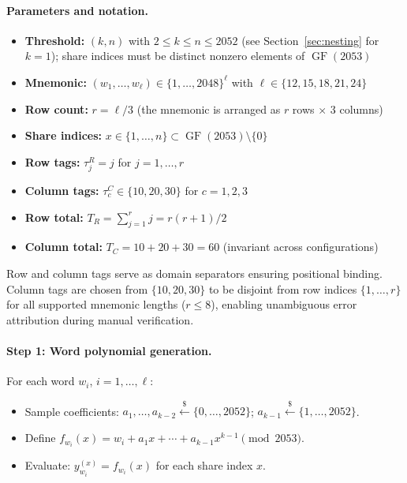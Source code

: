 \documentclass[11pt]{article}
\newcommand{\GF}{\operatorname{GF}}
\begin{document}
\paragraph{Parameters and notation.}
\begin{itemize}[noitemsep]
    \item \textbf{Threshold:} $(k, n)$ with $2 \leq k \leq n \leq 2052$ (see Section~\ref{sec:nesting} for $k = 1$); share indices must be distinct nonzero elements of $\GF(2053)$
    \item \textbf{Mnemonic:} $(w_1, \ldots, w_\ell) \in \{1, \ldots, 2048\}^\ell$ with $\ell \in \{12, 15, 18, 21, 24\}$
    \item \textbf{Row count:} $r = \ell / 3$ (the mnemonic is arranged as $r$ rows $\times$ 3 columns)
    \item \textbf{Share indices:} $x \in \{1, \ldots, n\} \subset \GF(2053) \setminus \{0\}$
    \item \textbf{Row tags:} $\tau^R_j = j$ for $j = 1, \ldots, r$
    \item \textbf{Column tags:} $\tau^C_c \in \{10, 20, 30\}$ for $c = 1, 2, 3$
    \item \textbf{Row total:} $T_R = \sum_{j=1}^{r} j = r(r+1)/2$
    \item \textbf{Column total:} $T_C = 10 + 20 + 30 = 60$ (invariant across configurations)
\end{itemize}

Row and column tags serve as domain separators ensuring positional binding. Column tags are chosen from $\{10, 20, 30\}$ to be disjoint from row indices $\{1, \ldots, r\}$ for all supported mnemonic lengths ($r \leq 8$), enabling unambiguous error attribution during manual verification.

\paragraph{Step 1: Word polynomial generation.} For each word $w_i$, $i = 1, \ldots, \ell$:
\begin{itemize}[noitemsep]
    \item Sample coefficients: $a_1, \ldots, a_{k-2} \xleftarrow{\$} \{0, \ldots, 2052\}$; $a_{k-1} \xleftarrow{\$} \{1, \ldots, 2052\}$.
    \item Define $f_{w_i}(x) = w_i + a_1 x + \cdots + a_{k-1} x^{k-1} \pmod{2053}$.
    \item Evaluate: $y_{w_i}^{(x)} = f_{w_i}(x)$ for each share index $x$.
\end{itemize}
\end{document}
